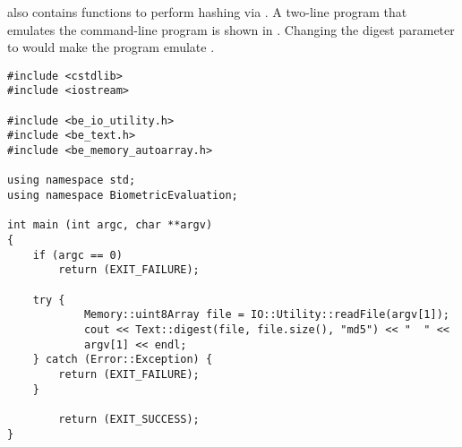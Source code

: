  also contains functions to perform  hashing via .
A two-line program that emulates the command-line  program is
shown in .  Changing the digest parameter to
 would make the program emulate .

\begin{lstlisting}[caption={\code{md5sum} via \sname}, label=text-digest]
#include <cstdlib>
#include <iostream>

#include <be_io_utility.h>
#include <be_text.h>
#include <be_memory_autoarray.h>

using namespace std;
using namespace BiometricEvaluation;

int main (int argc, char **argv)
{
	if (argc == 0)
		return (EXIT_FAILURE);
	
	try {
	        Memory::uint8Array file = IO::Utility::readFile(argv[1]);
	        cout << Text::digest(file, file.size(), "md5") << "  " <<
		    argv[1] << endl;
	} catch (Error::Exception) {
		return (EXIT_FAILURE);
	}

        return (EXIT_SUCCESS);
}
\end{lstlisting}

